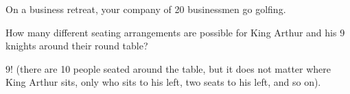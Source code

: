 \begin{questions}
\question On a business retreat, your company of 20 businessmen go golfing.

  \begin{answer}
  \end{answer}



\question How many different seating arrangements are possible for King Arthur and his 9 knights around their round table?

  \begin{answer}
     $9!$ (there are 10 people seated around the table, but it does not matter where King Arthur sits, only who sits to his left, two seats to his left, and so on).
  \end{answer}



\end{questions}